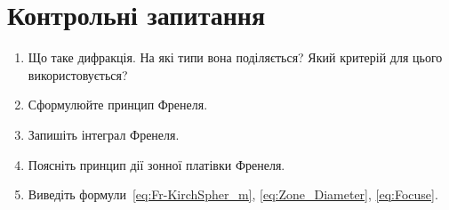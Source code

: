\section*{Контрольні запитання}
\begin{enumerate}[label*=\arabic*.]
	\item Що таке дифракція. На які типи вона поділяється? Який критерій для цього використовується?
	\item Сформулюйте принцип Френеля.
	\item Запишіть інтеграл Френеля.
	\item Поясніть принцип дії зонної платівки Френеля.
    \item Виведіть формули~\eqref{eq:Fr-KirchSpher_m}, \eqref{eq:Zone_Diameter}, \eqref{eq:Focuse}.
\end{enumerate} 

